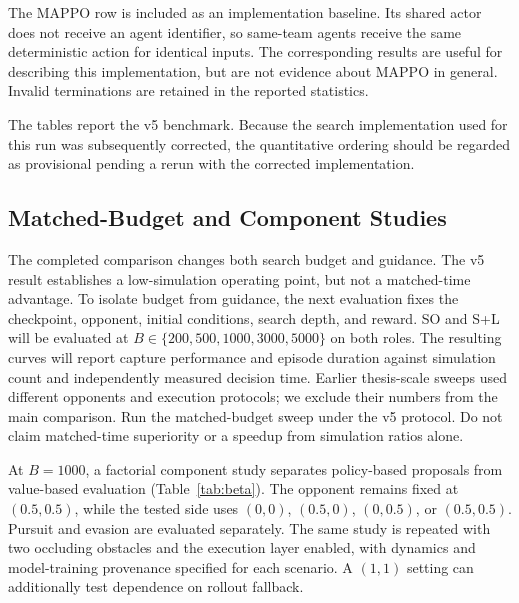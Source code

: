 \documentclass[letterpaper,10pt,conference]{ieeeconf}
\begin{document}
The MAPPO row is included as an implementation baseline. Its shared actor
does not receive an agent identifier, so same-team agents receive the same
deterministic action for identical inputs. The corresponding results are
useful for describing this implementation, but are not evidence about
MAPPO in general. Invalid terminations are retained in the reported
statistics.

The tables report the v5 benchmark. Because the search implementation used
for this run was subsequently corrected, the quantitative ordering should
be regarded as provisional pending a rerun with the corrected implementation.

\iffalse
\subsection{Matched-Budget and Component Studies}

The completed comparison changes both search budget and guidance.
The v5 result establishes a low-simulation operating point, but not a
matched-time advantage. To isolate budget from guidance, the next evaluation fixes the checkpoint,
opponent, initial conditions, search depth, and reward. SO and S+L will
be evaluated at $B\in\{200,500,1000,3000,5000\}$ on both roles.
The resulting curves will report capture performance and episode
duration against simulation count and independently measured decision
time. Earlier thesis-scale sweeps used different opponents and execution
protocols; we exclude their numbers from the main comparison.
Run the matched-budget sweep under the v5 protocol. Do not
claim matched-time superiority or a speedup from simulation ratios alone.

At $B=1000$, a factorial component study separates policy-based proposals
from value-based evaluation (Table~\ref{tab:beta}). The opponent remains
fixed at $(0.5,0.5)$, while the tested side uses $(0,0)$, $(0.5,0)$,
$(0,0.5)$, or $(0.5,0.5)$. Pursuit and evasion are evaluated separately.
The same study is repeated with two occluding obstacles and the execution
layer enabled, with dynamics and model-training provenance specified
for each scenario. A $(1,1)$ setting can additionally test dependence
on rollout fallback.
\end{document}
